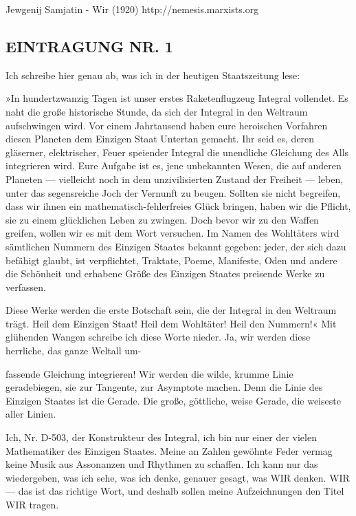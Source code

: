Jewgenij Samjatin - Wir (1920)
http://nemesis.marxists.org
\subsection{EINTRAGUNG NR. 1}

Ich schreibe hier genau ab, was ich in der heutigen Staatszeitung
lese:

»In hundertzwanzig Tagen ist unser erstes Raketenflugzeug Integral
vollendet. Es naht die große historische Stunde, da sich der
Integral in den Weltraum aufschwingen wird. Vor einem Jahrtausend
haben eure heroischen Vorfahren diesen Planeten dem Einzigen Staat
Untertan gemacht. Ihr seid es, deren gläserner, elektrischer, Feuer
speiender Integral die unendliche Gleichung des Alls integrieren
wird. Eure Aufgabe ist es, jene unbekannten Wesen, die auf anderen
Planeten — vielleicht noch in dem unzivilisierten Zustand der
Freiheit — leben, unter das segensreiche Joch der Vernunft zu
beugen. Sollten sie nicht begreifen, dass wir ihnen ein
mathematisch-fehlerfreies Glück bringen, haben wir die Pflicht, sie
zu einem glücklichen Leben zu zwingen. Doch bevor wir zu den Waffen
greifen, wollen wir es mit dem Wort versuchen. Im Namen des
Wohltäters wird sämtlichen Nummern des Einzigen Staates bekannt
gegeben: jeder, der sich dazu befähigt glaubt, ist verpflichtet,
Traktate, Poeme, Manifeste, Oden und andere die Schönheit und
erhabene Größe des Einzigen Staates preisende Werke zu verfassen.

Diese Werke werden die erste Botschaft sein, die der Integral in
den Weltraum trägt. Heil dem Einzigen Staat! Heil dem Wohltäter!
Heil den Nummern!« Mit glühenden Wangen schreibe ich diese Worte
nieder. Ja, wir werden diese herrliche, das ganze Weltall um-

fassende Gleichung integrieren! Wir werden die wilde, krumme Linie
geradebiegen, sie zur Tangente, zur Asymptote machen. Denn die
Linie des Einzigen Staates ist die Gerade. Die große, göttliche,
weise Gerade, die weiseste aller Linien.

Ich, Nr. D-503, der Konstrukteur des Integral, ich bin nur einer
der vielen Mathematiker des Einzigen Staates. Meine an Zahlen
gewöhnte Feder vermag keine Musik aus Assonanzen und Rhythmen zu
schaffen. Ich kann nur das wiedergeben, was ich sehe, was ich
denke, genauer gesagt, was WIR denken. WIR — das ist das richtige
Wort, und deshalb sollen meine Aufzeichnungen den Titel WIR
tragen.

